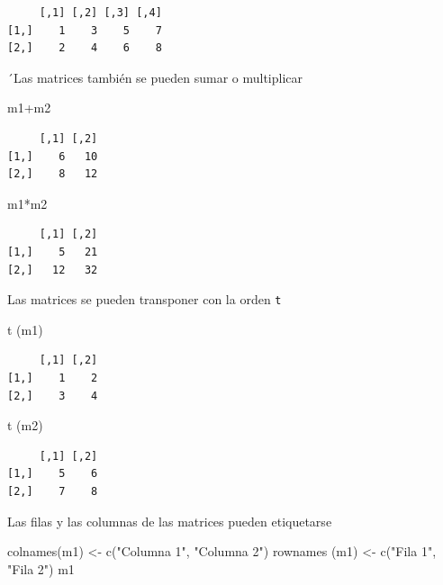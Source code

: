 \documentclass[
  letterpaper,
]{scrbook}
\newenvironment{Shaded}{\begin{snugshade}}{\end{snugshade}}
\newcommand{\FunctionTok}[1]{\textcolor[rgb]{0.28,0.35,0.67}{#1}}
\newcommand{\NormalTok}[1]{\textcolor[rgb]{0.00,0.23,0.31}{#1}}
\newcommand{\OtherTok}[1]{\textcolor[rgb]{0.00,0.23,0.31}{#1}}
\newcommand{\SpecialCharTok}[1]{\textcolor[rgb]{0.37,0.37,0.37}{#1}}
\newcommand{\StringTok}[1]{\textcolor[rgb]{0.13,0.47,0.30}{#1}}
\begin{document}
\begin{verbatim}
     [,1] [,2] [,3] [,4]
[1,]    1    3    5    7
[2,]    2    4    6    8
\end{verbatim}

´Las matrices también se pueden sumar o multiplicar

\begin{Shaded}
\begin{Highlighting}[]
\NormalTok{m1}\SpecialCharTok{+}\NormalTok{m2}
\end{Highlighting}
\end{Shaded}

\begin{verbatim}
     [,1] [,2]
[1,]    6   10
[2,]    8   12
\end{verbatim}

\begin{Shaded}
\begin{Highlighting}[]
\NormalTok{m1}\SpecialCharTok{*}\NormalTok{m2}
\end{Highlighting}
\end{Shaded}

\begin{verbatim}
     [,1] [,2]
[1,]    5   21
[2,]   12   32
\end{verbatim}

Las matrices se pueden transponer con la orden \texttt{t}

\begin{Shaded}
\begin{Highlighting}[]
\FunctionTok{t}\NormalTok{ (m1)}
\end{Highlighting}
\end{Shaded}

\begin{verbatim}
     [,1] [,2]
[1,]    1    2
[2,]    3    4
\end{verbatim}

\begin{Shaded}
\begin{Highlighting}[]
\FunctionTok{t}\NormalTok{ (m2)}
\end{Highlighting}
\end{Shaded}

\begin{verbatim}
     [,1] [,2]
[1,]    5    6
[2,]    7    8
\end{verbatim}

Las filas y las columnas de las matrices pueden etiquetarse

\begin{Shaded}
\begin{Highlighting}[]
\FunctionTok{colnames}\NormalTok{(m1) }\OtherTok{\textless{}{-}} \FunctionTok{c}\NormalTok{(}\StringTok{"Columna 1"}\NormalTok{, }\StringTok{"Columna 2"}\NormalTok{)}
\FunctionTok{rownames}\NormalTok{ (m1) }\OtherTok{\textless{}{-}} \FunctionTok{c}\NormalTok{(}\StringTok{"Fila 1"}\NormalTok{, }\StringTok{"Fila 2"}\NormalTok{)}
\NormalTok{m1}
\end{Highlighting}
\end{Shaded}
\end{document}
